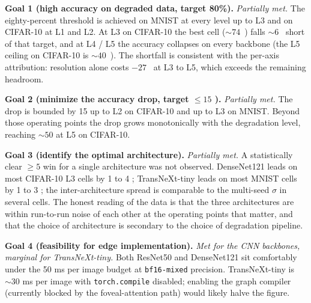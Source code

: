 \textbf{Goal 1 (high accuracy on degraded data, target 80\%).}\quad
\emph{Partially met.} The eighty-percent threshold is achieved on MNIST
at every level up to L3 and on CIFAR-10 at L1 and L2. At L3 on CIFAR-10
the best cell ($\sim 74$~\Mpp{}) falls $\sim 6$~\Mpp{} short of that
target, and at L4 / L5 the accuracy collapses on every backbone (the L5
ceiling on CIFAR-10 is $\sim 40$~\Mpp{}). The shortfall is consistent
with the per-axis attribution: resolution alone costs $-27$~\Mpp{} at
L3 to L5, which exceeds the remaining headroom.

\textbf{Goal 2 (minimize the accuracy drop, target $\leq 15$ \Mpp{}).}\quad
\emph{Partially met.} The drop is bounded by 15 \Mpp{} up to L2 on
CIFAR-10 and up to L3 on MNIST. Beyond those operating points the drop
grows monotonically with the degradation level, reaching $\sim 50$
\Mpp{} at L5 on CIFAR-10.

\textbf{Goal 3 (identify the optimal architecture).}\quad
\emph{Partially met.} A statistically clear $\geq 5$ \Mpp{} win for a
single architecture was not observed. DenseNet121 leads on most
CIFAR-10 L3 cells by 1 to 4 \Mpp{}; TransNeXt-tiny leads on most MNIST
cells by 1 to 3 \Mpp{}; the inter-architecture spread is comparable to
the multi-seed $\sigma$ in several cells. The honest reading of the
data is that the three architectures are within run-to-run noise of
each other at the operating points that matter, and that the choice of
architecture is secondary to the choice of degradation pipeline.

\textbf{Goal 4 (feasibility for edge implementation).}\quad
\emph{Met for the CNN backbones, marginal for TransNeXt-tiny.} Both
ResNet50 and DenseNet121 sit comfortably under the 50 ms per image
budget at \texttt{bf16-mixed} precision. TransNeXt-tiny is $\sim 30$ ms
per image with \texttt{torch.compile} disabled; enabling the graph
compiler (currently blocked by the foveal-attention path) would
likely halve the figure.

